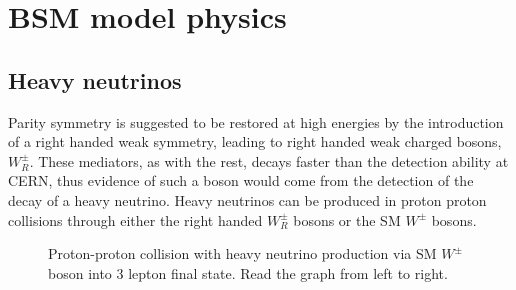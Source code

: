 \section{BSM model physics}

\subsection*{Heavy neutrinos}
Parity symmetry is suggested to be restored at high energies by the introduction of 
a right handed weak symmetry, leading to right handed weak charged bosons, $W_R^{\pm}$. 
These mediators, as with the rest, decays faster than the detection ability at CERN, thus 
evidence of such a boson would come from the detection of the decay of a heavy neutrino. Heavy neutrinos can 
be produced in proton proton collisions through either the right handed $W_R^{\pm}$ bosons or
the SM $W^{\pm}$ bosons. 


\begin{figure}[h!]
    \centering
    \caption{Proton-proton collision with heavy neutrino production via SM $W^{\pm}$ boson into 3 lepton final state. Read the graph from left to right.}
    \label{fig:Target_model_1}
    
\end{figure}




